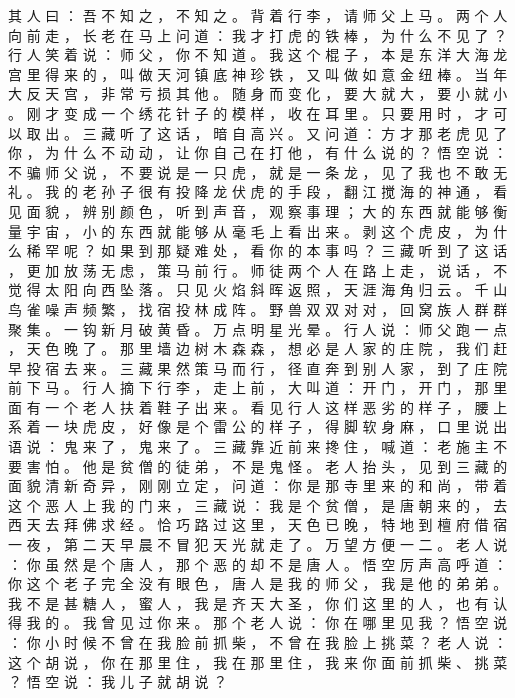 {其 人 曰 ： 吾 不 知 之 ， 不 知 之 。
背 着 行 李 ， 请 师 父 上 马 。
两 个 人 向 前 走 ， 长 老 在 马 上 问 道 ： 我 才 打 虎 的 铁 棒 ， 为 什 么 不 见 了 ？ 行 人 笑 着 说 ： 师 父 ， 你 不 知 道 。
我 这 个 棍 子 ， 本 是 东 洋 大 海 龙 宫 里 得 来 的 ， 叫 做 天 河 镇 底 神 珍 铁 ， 又 叫 做 如 意 金 纽 棒 。
当 年 大 反 天 宫 ， 非 常 亏 损 其 他 。
随 身 而 变 化 ， 要 大 就 大 ， 要 小 就 小 。
刚 才 变 成 一 个 绣 花 针 子 的 模 样 ， 收 在 耳 里 。
只 要 用 时 ， 才 可 以 取 出 。
三 藏 听 了 这 话 ， 暗 自 高 兴 。
又 问 道 ： 方 才 那 老 虎 见 了 你 ， 为 什 么 不 动 动 ， 让 你 自 己 在 打 他 ， 有 什 么 说 的 ？ 悟 空 说 ： 不 骗 师 父 说 ， 不 要 说 是 一 只 虎 ， 就 是 一 条 龙 ， 见 了 我 也 不 敢 无 礼 。
我 的 老 孙 子 很 有 投 降 龙 伏 虎 的 手 段 ， 翻 江 搅 海 的 神 通 ， 看 见 面 貌 ， 辨 别 颜 色 ， 听 到 声 音 ， 观 察 事 理 ； 大 的 东 西 就 能 够 衡 量 宇 宙 ， 小 的 东 西 就 能 够 从 毫 毛 上 看 出 来 。
剥 这 个 虎 皮 ， 为 什 么 稀 罕 呢 ？ 如 果 到 那 疑 难 处 ， 看 你 的 本 事 吗 ？
三 藏 听 到 了 这 话 ， 更 加 放 荡 无 虑 ， 策 马 前 行 。
师 徒 两 个 人 在 路 上 走 ， 说 话 ， 不 觉 得 太 阳 向 西 坠 落 。
只 见 火 焰 斜 晖 返 照 ， 天 涯 海 角 归 云 。
千 山 鸟 雀 噪 声 频 繁 ， 找 宿 投 林 成 阵 。
野 兽 双 双 对 对 ， 回 窝 族 人 群 群 聚 集 。
一 钩 新 月 破 黄 昏 。
万 点 明 星 光 晕 。
行 人 说 ： 师 父 跑 一 点 ， 天 色 晚 了 。
那 里 墙 边 树 木 森 森 ， 想 必 是 人 家 的 庄 院 ， 我 们 赶 早 投 宿 去 来 。
三 藏 果 然 策 马 而 行 ， 径 直 奔 到 别 人 家 ， 到 了 庄 院 前 下 马 。
行 人 摘 下 行 李 ， 走 上 前 ， 大 叫 道 ： 开 门 ， 开 门 ， 那 里 面 有 一 个 老 人 扶 着 鞋 子 出 来 。
看 见 行 人 这 样 恶 劣 的 样 子 ， 腰 上 系 着 一 块 虎 皮 ， 好 像 是 个 雷 公 的 样 子 ， 得 脚 软 身 麻 ， 口 里 说 出 语 说 ： 鬼 来 了 ， 鬼 来 了 。 三 藏 靠 近 前 来 搀 住 ， 喊 道 ： 老 施 主 不 要 害 怕 。
他 是 贫 僧 的 徒 弟 ， 不 是 鬼 怪 。
老 人 抬 头 ， 见 到 三 藏 的 面 貌 清 新 奇 异 ， 刚 刚 立 定 ， 问 道 ： 你 是 那 寺 里 来 的 和 尚 ， 带 着 这 个 恶 人 上 我 的 门 来 ， 三 藏 说 ： 我 是 个 贫 僧 ， 是 唐 朝 来 的 ， 去 西 天 去 拜 佛 求 经 。
恰 巧 路 过 这 里 ， 天 色 已 晚 ， 特 地 到 檀 府 借 宿 一 夜 ， 第 二 天 早 晨 不 冒 犯 天 光 就 走 了 。
万 望 方 便 一 二 。
老 人 说 ： 你 虽 然 是 个 唐 人 ， 那 个 恶 的 却 不 是 唐 人 。
悟 空 厉 声 高 呼 道 ： 你 这 个 老 子 完 全 没 有 眼 色 ， 唐 人 是 我 的 师 父 ， 我 是 他 的 弟 弟 。
我 不 是 甚 糖 人 ， 蜜 人 ， 我 是 齐 天 大 圣 ， 你 们 这 里 的 人 ， 也 有 认 得 我 的 。
我 曾 见 过 你 来 。
那 个 老 人 说 ： 你 在 哪 里 见 我 ？ 悟 空 说 ： 你 小 时 候 不 曾 在 我 脸 前 抓 柴 ， 不 曾 在 我 脸 上 挑 菜 ？ 老 人 说 ： 这 个 胡 说 ， 你 在 那 里 住 ， 我 在 那 里 住 ， 我 来 你 面 前 抓 柴 、 挑 菜 ？ 悟 空 说 ： 我 儿 子 就 胡 说 ？
}
